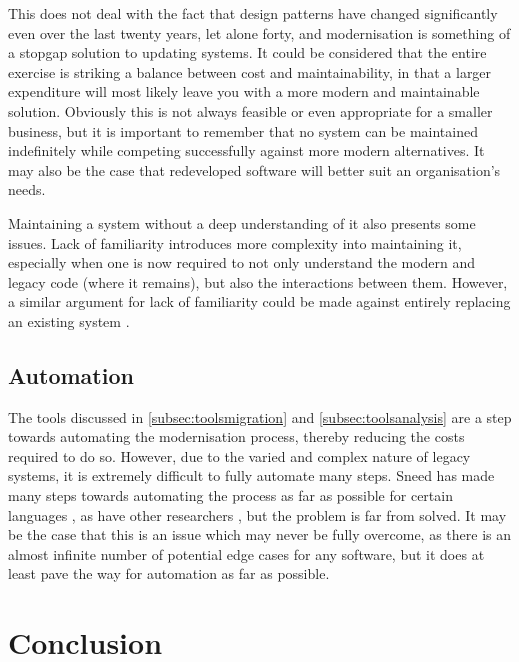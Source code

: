\documentclass[12pt,journal,compsoc]{IEEEtran}
\begin{document}
This does not deal with the fact that design patterns have changed significantly even over the last twenty years, let alone forty, and modernisation is something of a stopgap solution to updating systems. It could be considered that the entire exercise is striking a balance between cost and maintainability, in that a larger expenditure will most likely leave you with a more modern and maintainable solution. Obviously this is not always feasible or even appropriate for a smaller business, but it is important to remember that no system can be maintained indefinitely while competing successfully against more modern alternatives. It may also be the case that redeveloped software will better suit an organisation's needs.

Maintaining a system without a deep understanding of it also presents some issues. Lack of familiarity introduces more complexity into maintaining it, especially when one is now required to not only understand the modern and legacy code (where it remains), but also the interactions between them. However, a similar argument for lack of familiarity could be made against entirely replacing an existing system \cite{Almonaies2010}.

\subsection{Automation}
\label{subsec:automation}
The tools discussed in \autoref{subsec:toolsmigration} and \autoref{subsec:toolsanalysis} are a step towards automating the modernisation process, thereby reducing the costs required to do so. However, due to the varied and complex nature of legacy systems, it is extremely difficult to fully automate many steps. Sneed has made many steps towards automating the process as far as possible for certain languages \cite{Sneed2013,Sneed2011,Sneed2008,Sneed2009,Sneed1996,Sneed2001}, as have other researchers \cite{Deursen1998,Aversano2001,Chiang2001,Wu2005,O'Brien2005,Distante2006}, but the problem is far from solved. It may be the case that this is an issue which may never be fully overcome, as there is an almost infinite number of potential edge cases for any software, but it does at least pave the way for automation as far as possible.

\section{Conclusion}
\label{sec:conclusion}

\end{document}

